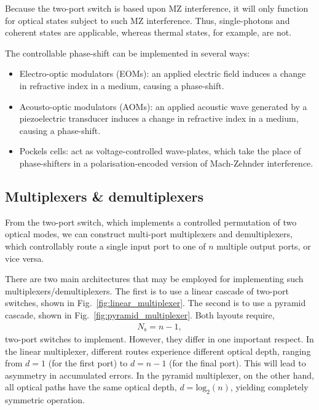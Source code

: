 \documentclass[aps,rmp,twocolumn,amsmath,amssymb,nofootinbib,superscriptaddress,longbibliography,floatfix,table-of-contents,eqsecnum]{revtex4-1}
\newcommand{\comment}[1]{{\color{blue}{\textbf{#1}}}}
\begin{document}
Because the two-port switch is based upon MZ interference, it will only function for optical states subject to such MZ interference. Thus, single-photons and coherent states are applicable, whereas thermal states, for example, are not.

The controllable phase-shift can be implemented in several ways:
\begin{itemize}
\item Electro-optic modulators (EOMs): an applied electric field induces a change in refractive index in a medium, causing a phase-shift.
\item Acousto-optic modulators (AOMs): an applied acoustic wave generated by a piezoelectric transducer induces a change in refractive index in a medium, causing a phase-shift.
\item Pockels cells: act as voltage-controlled wave-plates, 	which take the place of phase-shifters in a polarisation-encoded version of Mach-Zehnder interference. \comment{Is this right?}
\end{itemize}

%
%

\subsection{Multiplexers \& demultiplexers} 

From the two-port switch, which implements a controlled permutation of two optical modes, we can construct multi-port multiplexers and demultiplexers, which controllably route a single input port to one of $n$ multiple output ports, or vice versa.

There are two main architectures that may be employed for implementing such multiplexers/demultiplexers. The first is to use a linear cascade of two-port switches, shown in Fig.~\ref{fig:linear_multiplexer}. The second is to use a pyramid cascade, shown in Fig.~\ref{fig:pyramid_multiplexer}. Both layouts require,
\begin{align}
N_\mathrm{s} = n-1,
\end{align}
two-port switches to implement. However, they differ in one important respect. In the linear multiplexer, different routes experience different optical depth, ranging from \mbox{$d=1$} (for the first port) to \mbox{$d=n-1$} (for the final port). This will lead to asymmetry in accumulated errors. In the pyramid multiplexer, on the other hand, all optical paths have the same optical depth, \mbox{$d=\mathrm{log}_2(n)$}, yielding completely symmetric operation.
\end{document}
